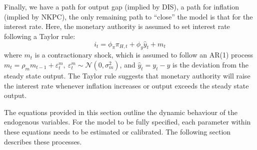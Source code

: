 Finally, we have a path for output gap (implied by DIS), a path for inflation (implied by NKPC), the only remaining path to ``close'' the model is that for the interest rate. Here, the monetary authority is assumed to set interest rate following a Taylor rule:
\begin{equation}
    i_t = \phi_\pi \pi_{H,t}+ \phi_y \hat{y}_t + m_t
\end{equation}
where $m_t$ is a contractionary shock, which is assumed to follow an AR(1) process $m_t = \rho_m m_{t-1} + \varepsilon^m_{t},\ \varepsilon^m_{t} \sim \mathcal{N}(0,\sigma^2_m)$, and $\hat{y}_t = y_t - y$ is the deviation from the steady state output. The Taylor rule suggests that monetary authority will raise the interest rate whenever inflation increases or output exceeds the steady state output.

The equations provided in this section outline the dynamic behaviour of the endogenous variables. For the model to be fully specified, each parameter within these equations needs to be estimated or calibrated. The following section describes these processes.